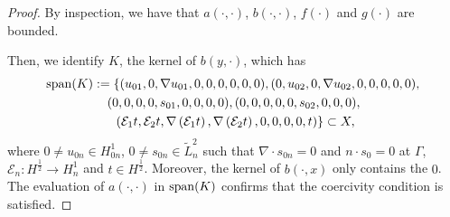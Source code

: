 \begin{proof}
By inspection, we have that $a(\cdot, \cdot)$, $b(\cdot, \cdot)$, $f(\cdot)$ and $g(\cdot)$ are bounded. %

Then, we identify $K$, the kernel of $b(y, \cdot)$, which has
\begin{multline}
\operatorname{span}(K) :=
            \left \{ (          u_{01},               0,                     \nabla u_{01},                                  0,      0,      0, 0, 0, 0),
                     (               0,          u_{02},                                 0,                      \nabla u_{02},      0,      0, 0, 0, 0),\right.\\
               \left.(               0,               0,                                 0,                                  0, s_{01},      0, 0, 0, 0),
                     (               0,               0,                                 0,                                  0,      0, s_{02}, 0, 0, 0),\right.\\
               \left.( \mathcal{E}_1 t, \mathcal{E}_2 t,\nabla\left(\mathcal{E}_1 t\right), \nabla\left(\mathcal{E}_2 t\right),      0,      0, 0, 0, t)\right \} \subset X,
\end{multline}
where $0 \neq u_{0n} \in H^1_{0n}$, $0 \neq s_{0n} \in \tilde{L}^2_n$ such that $\nabla \cdot s_{0n} = 0$ and $n\cdot s_0 = 0$ at $\Gamma$, $\mathcal{E}_n : H^\frac12 \to H^1_n$ and $t \in H^\frac12$. Moreover, the kernel of $b(\cdot, x)$ only contains the $0$.
The evaluation of $a(\cdot, \cdot)$ in $\operatorname{span}(K)$ confirms that the coercivity condition is satisfied.


\end{proof}

